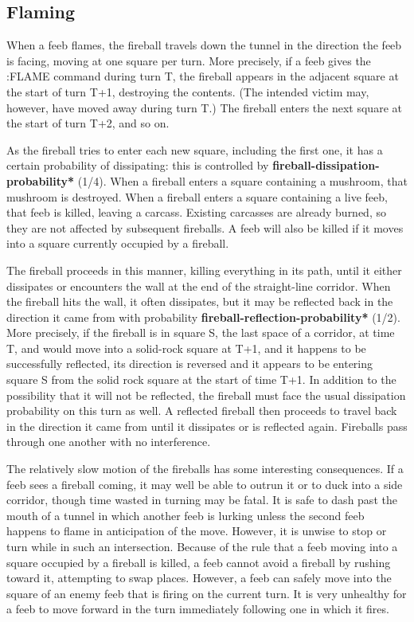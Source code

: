 \documentclass[12pt]{article}
\begin{document}
\subsection {Flaming}

When a feeb flames, the fireball travels down the tunnel in the direction
the feeb is facing, moving at one square per turn.  More precisely, if a
feeb gives the :FLAME command during turn T, the fireball appears in the
adjacent square at the start of turn T+1, destroying the contents.  (The
intended victim may, however, have moved away during turn T.)  The fireball
enters the next square at the start of turn T+2, and so on.

As the fireball tries to enter each new square, including the first one, it
has a certain probability of dissipating: this is controlled by
{\bf *fireball-dissipation-probability*} (1/4).  When a fireball enters a
square containing a mushroom, that mushroom is destroyed.  When a fireball
enters a square containing a live feeb, that feeb is killed, leaving a
carcass.  Existing carcasses are already burned, so they are not affected
by subsequent fireballs.  A feeb will also be killed if it moves into a
square currently occupied by a fireball.

The fireball proceeds in this manner, killing everything in its path,
until it either dissipates or encounters the wall at the end of the
straight-line corridor.  When the fireball hits the wall, it often
dissipates, but it may be reflected back in the direction it came from
with probability {\bf *fireball-reflection-probability*} (1/2).  More
precisely, if the fireball is in square S, the last space of a
corridor, at time T, and would move into a solid-rock square at T+1,
and it happens to be successfully reflected, its direction is reversed
and it appears to be entering square S from the solid rock square at
the start of time T+1.  In addition to the possibility that it will
not be reflected, the fireball must face the usual dissipation
probability on this turn as well.  A reflected fireball then proceeds
to travel back in the direction it came from until it dissipates or is
reflected again.  Fireballs pass through one another with no
interference.

The relatively slow motion of the fireballs has some interesting
consequences.  If a feeb sees a fireball coming, it may well be able
to outrun it or to duck into a side corridor, though time wasted in
turning may be fatal.  It is safe to dash past the mouth of a tunnel
in which another feeb is lurking unless the second feeb happens to
flame in anticipation of the move.  However, it is unwise to stop or
turn while in such an intersection.  Because of the rule that a feeb
moving into a square occupied by a fireball is killed, a feeb cannot
avoid a fireball by rushing toward it, attempting to swap places.
However, a feeb can safely move into the square of an enemy feeb that
is firing on the current turn.  It is very unhealthy for a feeb to
move forward in the turn immediately following one in which it fires.
\end{document}
